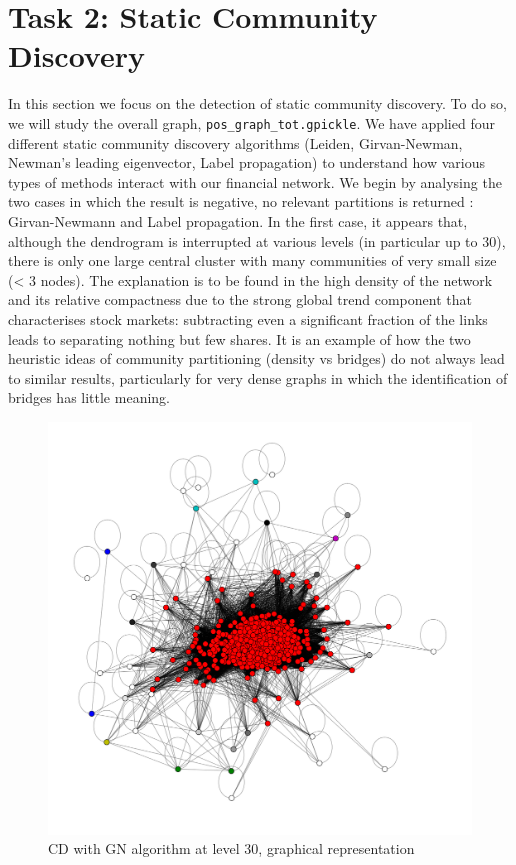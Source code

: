 \documentclass[sigchi]{acmart}
\begin{document}
\section{Task 2: Static Community Discovery}
In this section we focus on the detection of static community discovery. To do so, we will study the overall graph,  \texttt{pos\_graph\_tot.gpickle}.
We have applied four different static community discovery algorithms (Leiden, Girvan-Newman, Newman’s leading eigenvector, Label propagation) to understand how various types of methods interact with our financial network. We begin by analysing the two cases in which the result is negative, no relevant partitions is returned : Girvan-Newmann and Label propagation. In the first case, it appears that, although the dendrogram is interrupted at various levels (in particular up to 30), there is only one large central cluster with many communities of very small size (< 3 nodes). The explanation is to be found in the high density of the network and its relative compactness due to the strong global trend component that characterises stock markets: subtracting even 
a significant fraction of the links leads to separating nothing but few shares.
It is an example of how the two heuristic ideas of community partitioning (density vs bridges) do not always lead to similar results, particularly for very dense graphs in which the identification of bridges has little meaning.
\begin{figure}[h]
	\centering
	\includegraphics[width=\linewidth]{CD_GN.png}
	\caption{CD with GN algorithm at level 30, graphical representation}
\end{figure}
\end{document}
